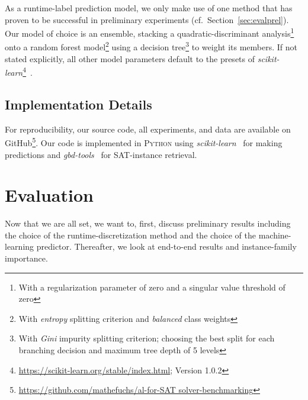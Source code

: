 \documentclass[runningheads]{llncs}
\begin{document}
As a runtime-label prediction model, we only make use of one method that has proven to be successful in preliminary experiments (cf.~Section~\ref{sec:evalprel}).
Our model of choice is an ensemble, stacking a quadratic-discriminant analysis\footnote{With a regularization parameter of zero and a singular value threshold of zero} onto a random forest model\footnote{With \emph{entropy} splitting criterion and \emph{balanced} class weights} using a decision tree\footnote{With \emph{Gini} impurity splitting criterion; choosing the best split for each branching decision and maximum tree depth of 5 levels} to weight its members.
If not stated explicitly, all other model parameters default to the presets of \emph{scikit-learn}\footnote{\url{https://scikit-learn.org/stable/index.html}; Version 1.0.2}~\cite{scikit-learn}.


\subsection{Implementation Details}

For reproducibility, our source code, all experiments, and data are available on GitHub\footnote{\url{https://github.com/mathefuchs/al-for-SAT solver-benchmarking}}.
Our code is implemented in \textsc{Python} using \emph{scikit-learn}~\cite{scikit-learn} for making predictions and \emph{gbd-tools}~\cite{IserS18} for SAT-instance retrieval.


\section{Evaluation}
\label{sec:eval}
Now that we are all set, we want to, first, discuss preliminary results including the choice of the runtime-discretization method and the choice of the machine-learning predictor.
Thereafter, we look at end-to-end results and instance-family importance.
\end{document}
